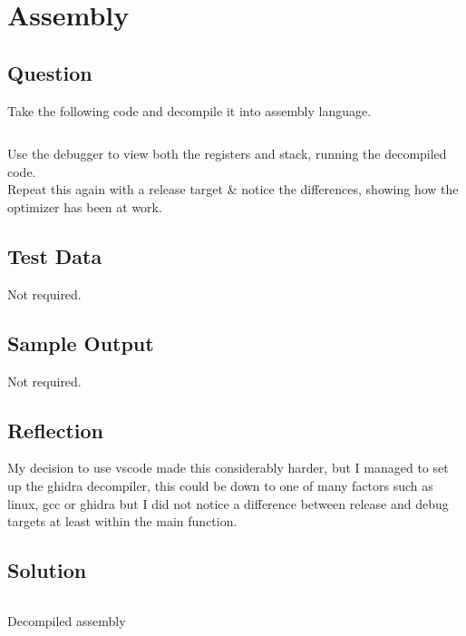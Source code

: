 \documentclass[Lab-B.tex]{subfiles}
\begin{document}
    \section{Assembly}
        \subsection{Question}
            Take the following code and decompile it into assembly language.

            \inputminted{cpp}{../Tasks/03-Assembly/Assembly.cpp}

            Use the debugger to view both the registers and stack, 
            running the decompiled code.\\

            Repeat this again with a release target \& notice the differences,
            showing how the optimizer has been at work.

        \subsection{Test Data}
            Not required.
        
        \subsection{Sample Output}
            Not required.
        \subsection{Reflection}
            My decision to use vscode made this considerably harder, but I managed to set up
            the ghidra decompiler, this could be down to one of many factors such as linux, gcc or ghidra
            but I did not notice a difference between release and debug targets at least within the main function.

        \subsection{Solution}
            \begin{listing}[H]            
                {\renewcommand\fcolorbox[4][]{\textcolor{cyan}{\strut#4}}
                    \inputminted[fontsize=\tiny]{gas}{../Tasks/03-Assembly/Assembly.txt}
                    \caption{Decompiled assembly}
                }
            \end{listing}
\end{document}
